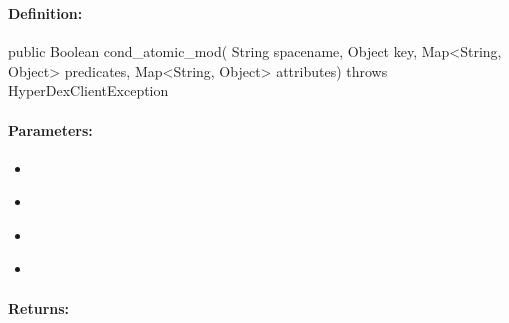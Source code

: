 \subsubsection{}
\label{api:java:cond_atomic_mod}


\paragraph{Definition:}
\begin{javacode}
public Boolean cond_atomic_mod(
        String spacename,
        Object key,
        Map<String, Object> predicates,
        Map<String, Object> attributes) throws HyperDexClientException
\end{javacode}

\paragraph{Parameters:}
\begin{itemize}[noitemsep]
\item {}\\

\item {}\\

\item {}\\

\item {}\\

\end{itemize}

\paragraph{Returns:}


\pagebreak
\subsubsection{}
\label{api:java:async_cond_atomic_mod}


